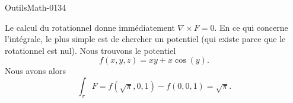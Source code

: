 
\begin{corrige}{OutilsMath-0134}

    Le calcul du rotationnel donne immédiatement \( \nabla \times F=0\). En ce qui concerne l'intégrale, le plus simple est de chercher un potentiel (qui existe parce que le rotationnel est nul). Nous trouvons le potentiel
    \begin{equation}
        f(x,y,z)=xy+x\cos(y).
    \end{equation}
    Nous avons alors
    \begin{equation}
        \int_{\sigma}F=f(\sqrt{\pi},0,1)-f(0,0,1)=\sqrt{\pi}.
    \end{equation}

\end{corrige}

